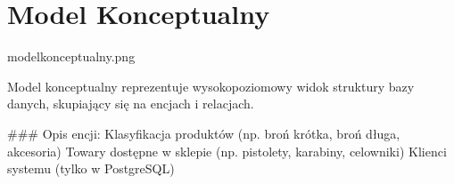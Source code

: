\documentclass[letterpaper,10pt,polish]{sphinxmanual}
\begin{document}
\section{Model Konceptualny}
\label{\detokenize{rozdzial3/index:model-konceptualny}}
\sphinxAtStartPar
model\sphinxhyphen{}konceptualny.png

\sphinxAtStartPar
Model konceptualny reprezentuje wysokopoziomowy widok struktury bazy danych, skupiający się na encjach i relacjach.

\sphinxAtStartPar
{}

\sphinxAtStartPar
\#\#\# Opis encji:
\sphinxhyphen{}  \sphinxhyphen{} Klasyfikacja produktów (np. broń krótka, broń długa, akcesoria)
\sphinxhyphen{}  \sphinxhyphen{} Towary dostępne w sklepie (np. pistolety, karabiny, celowniki)
\sphinxhyphen{}  \sphinxhyphen{} Klienci systemu (tylko w PostgreSQL)
\end{document}
